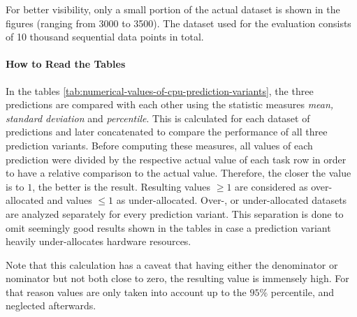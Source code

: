 \documentclass{article}
\begin{document}
    For better visibility, only a small portion of the actual dataset is shown in the figures (ranging from 3000 to 3500).
    The dataset used for the evaluation consists of 10 thousand sequential data points in total.

  \paragraph{How to Read the Tables}
  \label{par:how-to-read-tables}

    In the tables \ref{tab:numerical-values-of-cpu-prediction-variants}, the three predictions are compared with each other using the statistic measures \emph{mean, standard deviation} and \emph{percentile}.  
    This is calculated for each dataset of predictions and later concatenated to compare the performance of all three prediction variants.
    Before computing these measures, all values of each prediction were divided by the respective actual value of each task row in order to have a relative comparison to the actual value. Therefore, the closer the value is to $1$, the better is the result.
    Resulting values $\geq 1$ are considered as over-allocated and values $\le 1$ as under-allocated. 
    Over-, or under-allocated datasets are analyzed separately for every prediction variant.
    This separation is done to omit seemingly good results shown in the tables in case a prediction variant heavily under-allocates hardware resources.
    
    Note that this calculation has a caveat that having either the denominator or nominator but not both close to zero, the resulting value is immensely high. For that reason values are only taken into account up to the $95\%$ percentile, and neglected afterwards.
\end{document}
